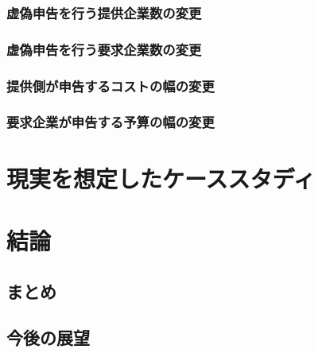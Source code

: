 \hypertarget{ux865aux507dux7533ux544aux3092ux884cux3046ux63d0ux4f9bux4f01ux696dux6570ux306eux5909ux66f4-1}{%
\subsection{虚偽申告を行う提供企業数の変更}\label{ux865aux507dux7533ux544aux3092ux884cux3046ux63d0ux4f9bux4f01ux696dux6570ux306eux5909ux66f4-1}}

\hypertarget{ux865aux507dux7533ux544aux3092ux884cux3046ux8981ux6c42ux4f01ux696dux6570ux306eux5909ux66f4-1}{%
\subsection{虚偽申告を行う要求企業数の変更}\label{ux865aux507dux7533ux544aux3092ux884cux3046ux8981ux6c42ux4f01ux696dux6570ux306eux5909ux66f4-1}}

\hypertarget{ux63d0ux4f9bux5074ux304cux7533ux544aux3059ux308bux30b3ux30b9ux30c8ux306eux5e45ux306eux5909ux66f4-1}{%
\subsection{提供側が申告するコストの幅の変更}\label{ux63d0ux4f9bux5074ux304cux7533ux544aux3059ux308bux30b3ux30b9ux30c8ux306eux5e45ux306eux5909ux66f4-1}}

\hypertarget{ux8981ux6c42ux4f01ux696dux304cux7533ux544aux3059ux308bux4e88ux7b97ux306eux5e45ux306eux5909ux66f4-1}{%
\subsection{要求企業が申告する予算の幅の変更}\label{ux8981ux6c42ux4f01ux696dux304cux7533ux544aux3059ux308bux4e88ux7b97ux306eux5e45ux306eux5909ux66f4-1}}

\hypertarget{ux73feux5b9fux3092ux60f3ux5b9aux3057ux305fux30b1ux30fcux30b9ux30b9ux30bfux30c7ux30a3}{%
\chapter{現実を想定したケーススタディ}\label{ux73feux5b9fux3092ux60f3ux5b9aux3057ux305fux30b1ux30fcux30b9ux30b9ux30bfux30c7ux30a3}}

\hypertarget{ux7d50ux8ad6}{%
\chapter{結論}\label{ux7d50ux8ad6}}

\hypertarget{ux307eux3068ux3081}{%
\section{まとめ}\label{ux307eux3068ux3081}}

\hypertarget{ux4ecaux5f8cux306eux5c55ux671b}{%
\section{今後の展望}\label{ux4ecaux5f8cux306eux5c55ux671b}}
